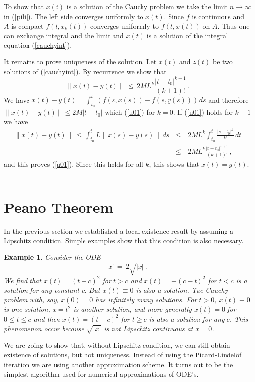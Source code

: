 \documentclass[12pt]{report}
\newtheorem{example}[theorem]{Example}
\newcommand{\nn}{\nonumber}
\def\eqref#1{(\ref{#1})}
\def\qed{\hbox{\hskip 6pt\vrule width6pt height7pt depth1pt
    \hskip1pt}\bigskip}
\def\to{\rightarrow}
\begin{document}
To show that $x(t)$ is a solution of the Cauchy problem we take the
limit $n \to \infty$ in \eqref{pili}.  The left side converges
uniformly to $x(t)$. Since $f$ is continuous and $A$ is compact
$f(t,x_k(t))$ converges uniformly to $f(t,x(t))$ on $A$. Thus one can
exchange integral and the limit and $x(t)$ is a solution of the
integral equation \eqref{cauchyint}.

It remains to prove uniqueness of the solution. Let $x(t)$ and $z(t)$
be two solutions of \eqref{cauchyint}.  By recurrence we show that
\begin{equation}\label{u01} 
\|x(t) - y(t) \| \,\le \, 2M L^k \frac{|t-t_0|^{k+1}}{(k+1)!}\,.
\end{equation}  
We have $x(t) - y(t) = \int_{t_0}^t (f(s,x(s)) - f(s,y(s)))\,ds$ and therefore 
$\|x(t) - y(t) \| \le  2M|t-t_0|$ which
\eqref{u01} for $k=0$.  If \eqref{u01} holds for $k-1$ we have 
\begin{eqnarray}
\|x(t) - y(t)\|\,\le\,  \int_{t_0}^t L \| x(s) - y(s)\| \,ds \,&\le&\,  
2ML^{k} \int_{t_0}^t \frac{|s-t_0|^{k}}{k!} \,dt  \nn \\
\,&\le&\,2M L^k \frac{|t-t_0|^{k+1}}{(k+1)!} \,,
\end{eqnarray}
and this proves \eqref{u01}.  Since this holds for all $k$, this shows
that $x(t) = y(t)$. \hfill \qed


\section{Peano Theorem}
In the previous section we established a local existence result by
assuming a Lipschitz condition.  Simple examples show that this
condition is also necessary.

\begin{example}{\rm  Consider the ODE
\begin{equation}
x'\,=\, 2 \sqrt{|x|} \,.
\end{equation}
We find that $x(t) =(t-c)^2$ for $t>c$ and $x(t) = -(c-t)^2$ for $t<c$
is a solution for any constant $c$.  But $x(t) \equiv 0$ is also a solution.
The Cauchy problem with, say, $x(0)=0$ has infinitely many solutions.
For $t>0$, $x(t) \equiv 0$ is one solution, $x= t^2$ is another solution,
and more generally $x(t)=0$ for $0\le t \le c$ and then $x(t) =(t-c)^2$
for $t \ge c$ is also a solution for any $c$. This phenomenon occur
because $\sqrt{|x|}$ is not Lipschitz continuous at $x=0$.  
}
\end{example}

We are going to show that, without Lipschitz condition, we can still
obtain existence of solutions, but not uniqueness. Instead of using
the Picard-Lindel\"of iteration we are using another approximation
scheme.  It turns out to be the simplest algorithm used for numerical
approximations of ODE's. 
\end{document}
